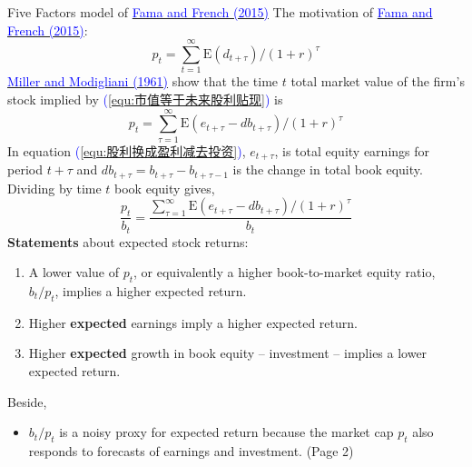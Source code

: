 \documentclass{beamer}
\begin{document}
\begin{frame}[allowframebreaks]{Five Factors model of \href{https://doi.org/10.1016/j.jfineco.2014.10.010}{\textcolor{blue}{Fama and French (2015)}}}
	The motivation of \href{https://doi.org/10.1016/j.jfineco.2014.10.010}{\textcolor{blue}{Fama and French (2015)}}:
	\begin{equation}\label{equ:市值等于未来股利贴现}
		p_{t}=\sum_{t=1}^{\infty} \mathrm{E}\left(d_{t+\tau}\right) /(1+r)^{\tau}
	\end{equation}
\href{http://www.jstor.org/stable/2351143}{\textcolor{blue}{Miller and Modigliani (1961)}} show that the time $ t $ total market value of the firm's stock implied by \textcolor{blue}{(\ref{equ:市值等于未来股利贴现})} is
\begin{equation}\label{equ:股利换成盈利减去投资}
	p_{t}=\sum_{\tau=1}^{\infty} \mathrm{E}\left(e_{t+\tau}-d b_{t+\tau}\right) /(1+r)^{\tau}
\end{equation}
In equation \textcolor{blue}{(\ref{equ:股利换成盈利减去投资})}, $e_{t+\tau}$, is total equity earnings for period $t+\tau$ and $d b_{t+\tau}=b_{t+\tau}-b_{t+\tau-1}$ is the change in total book equity. Dividing by time $ t $ book equity gives,
\begin{equation}\label{equ:市值账面比}
	\frac{p_{t}}{b_{t}}=\frac{\sum_{\tau=1}^{\infty} \mathrm{E}\left(e_{t+\tau}-d b_{t+\tau}\right) /(1+r)^{\tau}}{b_{t}}
\end{equation}
\textbf{Statements} about expected stock returns:
\begin{enumerate}
	\item A lower value of $ p_t $, or equivalently a higher book-to-market
	equity ratio, $ b_t/p_t $, implies a higher expected return.
	\item Higher \textbf{expected} earnings imply a
	higher expected return.
	\item Higher \textbf{expected} growth in book equity – investment – implies a lower expected return.
\end{enumerate}
Beside,
\begin{itemize}
	\item $ b_t/p_t $ is
	a noisy proxy for expected return because the market cap
	$ p_t $ also responds to forecasts of earnings and investment. (Page 2)
\end{itemize}
\end{frame}
\end{document}
